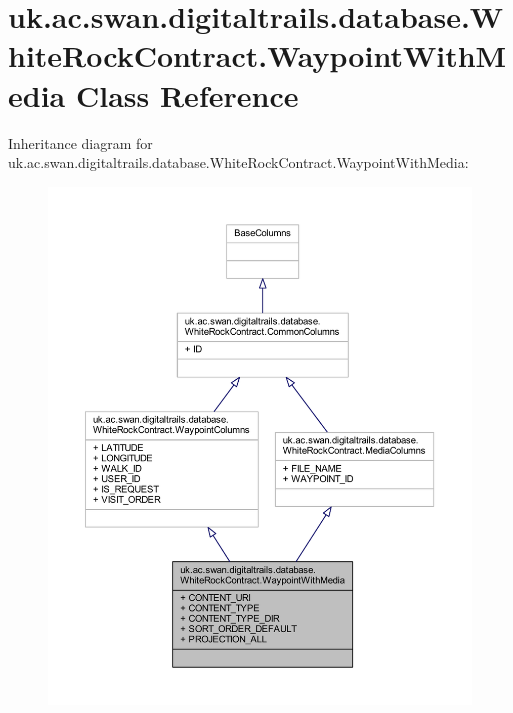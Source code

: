 \hypertarget{classuk_1_1ac_1_1swan_1_1digitaltrails_1_1database_1_1_white_rock_contract_1_1_waypoint_with_media}{\section{uk.\+ac.\+swan.\+digitaltrails.\+database.\+White\+Rock\+Contract.\+Waypoint\+With\+Media Class Reference}
\label{classuk_1_1ac_1_1swan_1_1digitaltrails_1_1database_1_1_white_rock_contract_1_1_waypoint_with_media}
}


Inheritance diagram for uk.\+ac.\+swan.\+digitaltrails.\+database.\+White\+Rock\+Contract.\+Waypoint\+With\+Media\+:
\nopagebreak
\begin{figure}[H]
\begin{center}
\leavevmode
\includegraphics[width=350pt]{classuk_1_1ac_1_1swan_1_1digitaltrails_1_1database_1_1_white_rock_contract_1_1_waypoint_with_media__inherit__graph}
\end{center}
\end{figure}



